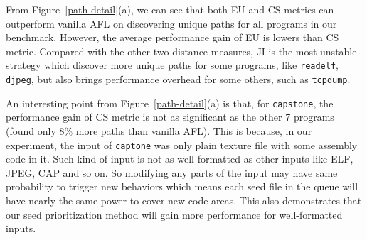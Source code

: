 
From Figure~\ref{path-detail}(a), we can see that both EU and CS metrics can outperform vanilla AFL on discovering unique paths for all programs in our benchmark. 
However, the average performance gain of EU is lowers than CS metric. 
Compared with the other two distance measures, JI is the most unstable strategy which discover more unique paths for some programs, like \texttt{readelf}, \texttt{djpeg}, but also brings performance overhead for some others, such as \texttt{tcpdump}.

An interesting point from Figure~\ref{path-detail}(a) is that, for \texttt{capstone}, the performance gain of CS metric is not as significant as the other 7 programs (found only 8\% more paths than vanilla AFL).
 This is because, in our experiment, the input of \texttt{captone} was only plain texture file with some assembly code in it. Such kind of input is not as well formatted as other inputs like ELF, JPEG, CAP and so on. 
 So modifying any parts of the input may have same probability to trigger new behaviors which means each seed file in the queue will have nearly the same power to cover new code areas. This also demonstrates that our seed prioritization method will gain more performance for well-formatted inputs.


